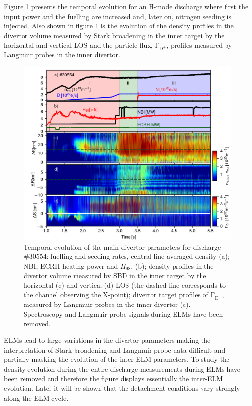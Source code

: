 \documentclass[12pt]{iopart}
\begin{document}
Figure \ref{fig:evo_30554} presents the temporal evolution for an H-mode discharge where first the input power and the fuelling are increased and, later on, nitrogen seeding is injected. Also shown in figure \ref{fig:evo_30554} is the evolution of the density profiles in the divertor volume measured by Stark broadening in the inner target by the horizontal and vertical LOS and the particle flux, $\mathrm{\Gamma_{D^{+}}}$, profiles measured by Langmuir probes in the inner divertor.

\begin{figure}[!hbt]
\centering
\includegraphics[]{dr_30554.png}
\caption[Overview of discharge \#30554.]{Temporal evolution of the main divertor parameters for discharge \#30554: fuelling and seeding rates, central line-averaged density (a); NBI, ECRH heating power and $H_{98}$, (b); density profiles in the divertor volume measured by SBD in the inner target by the horizontal (c) and vertical (d) LOS (the dashed line corresponds to the channel observing the X-point);
divertor target profiles of $\mathrm{\Gamma_{D^{+}}}$, measured by Langmuir probes in the inner divertor (e).
Spectroscopy and Langmuir probe signals during ELMs have been removed.}
\label{fig:evo_30554}
\end{figure}


ELMs lead to large variations in the divertor parameters making the interpretation of Stark broadening and Langmuir probe data difficult and partially masking the evolution of the inter-ELM parameters. To study the density evolution during the entire discharge measurements during ELMs have been removed and therefore the figure displays essentially the inter-ELM evolution. Later it will be shown that the detachment conditions vary strongly along the ELM cycle.
\end{document}
